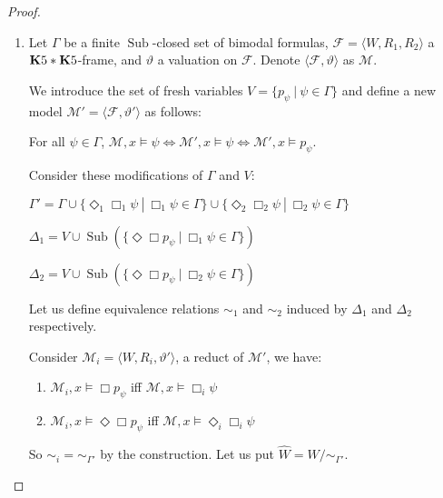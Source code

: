 \documentclass[a4paper]{article}
\theoremstyle{defin}
\theoremstyle{theorem}
\theoremstyle{prop}
\theoremstyle{lemma}
\theoremstyle{fact}
\theoremstyle{ex}
\theoremstyle{col}
\theoremstyle{claim}
\begin{document}
\begin{proof}
$ $

  \begin{enumerate}
  \item Let $\Gamma$ be a finite $\operatorname{Sub}$-closed set of bimodal formulas,
  $\mathcal{F} = \langle W, R_1, R_2 \rangle$ a ${\bf K}5 * {\bf K}5$-frame, and $\vartheta$ a valuation on $\mathcal{F}$. Denote $\langle \mathcal{F}, \vartheta \rangle$ as $\mathcal{M}$.

  We introduce the set of fresh variables $V = \{ p_{\psi} \: | \: \psi \in \Gamma \}$ and define a new model $\mathcal{M}' = \langle \mathcal{F}, \vartheta' \rangle$ as follows:
  \begin{center}
    For all $\psi \in \Gamma$, $\mathcal{M}, x \models \psi \Leftrightarrow \mathcal{M}', x \models \psi \Leftrightarrow \mathcal{M}', x \models p_{\psi}$.
  \end{center}

  Consider these modifications of $\Gamma$ and $V$:

  \begin{center}
    $\Gamma' = \Gamma \cup \{ \Diamond_1 \Box_1 \psi \: | \: \Box_1 \psi \in \Gamma \} \cup \{ \Diamond_2 \Box_2 \psi \: | \: \Box_2 \psi \in \Gamma \}$

    $\Delta_1 = V \cup \operatorname{Sub}(\{ \Diamond \Box p_{\psi} \: | \: \Box_1 \psi \in \Gamma \})$

    $\Delta_2 = V \cup \operatorname{Sub}(\{ \Diamond \Box p_{\psi} \: | \: \Box_2 \psi \in \Gamma \})$
  \end{center}
  Let us define equivalence relations $\sim_1$ and $\sim_2$ induced by $\Delta_1$ and $\Delta_2$ respectively.

  Consider $\mathcal{M}_i = \langle W, R_i, \vartheta' \rangle$, a reduct of $\mathcal{M}'$, we have:
  \begin{enumerate}
    \item $\mathcal{M}_i, x \models \Box p_{\psi}$ iff $\mathcal{M}, x \models \Box_i \psi$
    \item $\mathcal{M}_i, x \models \Diamond \Box p_{\psi}$ iff $\mathcal{M}, x \models \Diamond_i \Box_i \psi$
  \end{enumerate}
  So $\sim_i = \sim_{\Gamma'}$ by the construction. Let us put $\widehat{W} = W / \sim_{\Gamma'}$.


\end{enumerate}
\end{proof}
\end{document}
